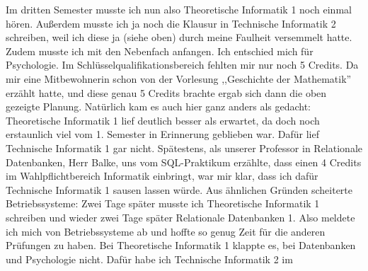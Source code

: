 \begin{multicols}{2}
Im dritten Semester musste ich nun also Theoretische Informatik 1 noch
einmal hören.  Außerdem musste ich ja noch die Klausur in Technische
Informatik 2 schreiben, weil ich diese ja (siehe oben) durch meine
Faulheit versemmelt hatte. Zudem musste ich mit den Nebenfach
anfangen. Ich entschied mich für Psychologie. Im
Schlüsselqualifikationsbereich fehlten mir nur noch 5 Credits. Da mir
eine Mitbewohnerin 
schon von der Vorlesung ,,Geschichte der Mathematik''  erzählt hatte,
und diese genau 5 Credits brachte ergab sich dann die oben gezeigte Planung.
Natürlich kam es auch hier ganz anders als gedacht: Theoretische
Informatik 1 lief deutlich besser als erwartet, da doch noch
erstaunlich viel vom 1. Semester in Erinnerung geblieben war. Dafür
lief Technische Informatik 1 gar nicht. Spätestens, als unserer
Professor in Relationale Datenbanken, Herr Balke, uns vom
SQL-Praktikum erzählte, dass einen 4 Credits im Wahlpflichtbereich
Informatik einbringt, war mir klar, dass ich dafür Technische
Informatik 1 sausen lassen würde. Aus ähnlichen Gründen scheiterte
Betriebssysteme: Zwei Tage später musste ich Theoretische Informatik 1
schreiben und wieder zwei Tage später Relationale Datenbanken 1. Also
meldete ich mich von Betriebssysteme ab und hoffte so genug Zeit für
die anderen Prüfungen zu haben. Bei Theoretische Informatik 1 klappte
es, bei Datenbanken und Psychologie nicht. Dafür habe ich Technische Informatik 2 im

\end{multicols}
